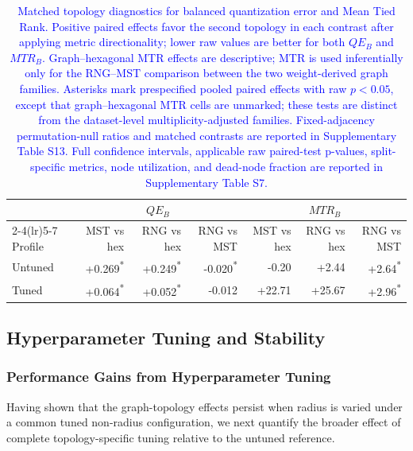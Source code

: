 \documentclass[10pt]{article} %
\newcommand{\TrackedChange}[1]{\textcolor{blue}{#1}}
\begin{document}
\begin{table}[tb]
\caption{\TrackedChange{Matched topology diagnostics for balanced quantization error and Mean Tied Rank. Positive paired effects favor the second topology in each contrast after applying metric directionality; lower raw values are better for both $QE_B$ and $MTR_B$. Graph--hexagonal MTR effects are descriptive; MTR is used inferentially only for the RNG--MST comparison between the two weight-derived graph families. Asterisks mark prespecified pooled paired effects with raw $p<0.05$, except that graph--hexagonal MTR cells are unmarked; these tests are distinct from the dataset-level multiplicity-adjusted families. Fixed-adjacency permutation-null ratios and matched contrasts are reported in Supplementary Table S13. Full confidence intervals, applicable raw paired-test p-values, split-specific metrics, node utilization, and dead-node fraction are reported in Supplementary Table S7.}}
\label{tab:matched_topology_diagnostics_summary}
\begin{center}
\begin{tabular}{lrrrrrr}
\toprule
& \multicolumn{3}{c}{$QE_B$} & \multicolumn{3}{c}{$MTR_B$} \\
\cmidrule(lr){2-4}\cmidrule(lr){5-7}
Profile & MST vs hex & RNG vs hex & RNG vs MST & MST vs hex & RNG vs hex & RNG vs MST \\
\midrule
Untuned & +0.269\textsuperscript{*} & +0.249\textsuperscript{*} & -0.020\textsuperscript{*} & -0.20 & +2.44 & +2.64\textsuperscript{*} \\
Tuned & +0.064\textsuperscript{*} & +0.052\textsuperscript{*} & -0.012 & +22.71 & +25.67 & +2.96\textsuperscript{*} \\
\bottomrule
\end{tabular}
\end{center}
\end{table}

\subsection{Hyperparameter Tuning and Stability}

\subsubsection{Performance Gains from Hyperparameter Tuning}

Having shown that the graph-topology effects persist when radius is varied under a common tuned non-radius configuration, we next quantify the broader effect of complete topology-specific tuning relative to the untuned reference.
\end{document}
